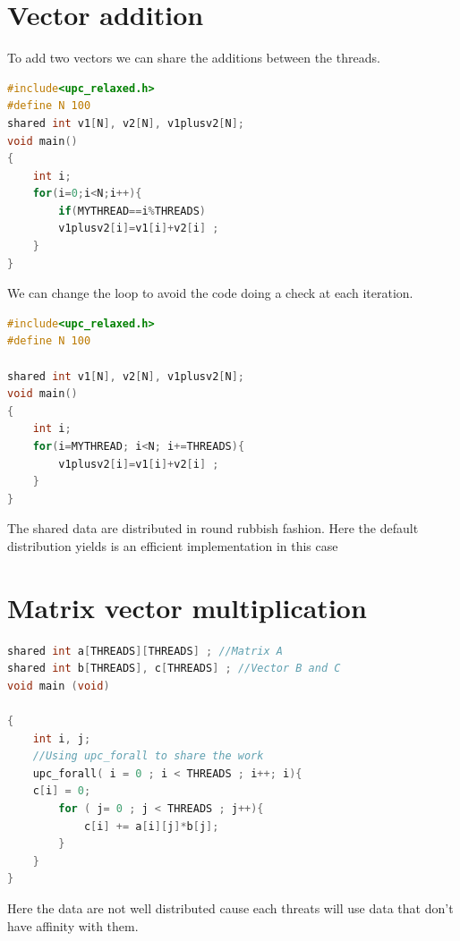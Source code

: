 \documentclass{report}
\begin{document}
\section{Vector addition}

To add two vectors we can share the additions between the threads.

\begin{lstlisting}[language=C]
#include<upc_relaxed.h> 
#define N 100 
shared int v1[N], v2[N], v1plusv2[N]; 
void main() 
{ 
    int i; 
    for(i=0;i<N;i++){
        if(MYTHREAD==i%THREADS) 
        v1plusv2[i]=v1[i]+v2[i] ; 
    }
}
\end{lstlisting}

    We can change the loop to avoid the code doing a check at each iteration.

\begin{lstlisting}[language=C]
#include<upc_relaxed.h> 
#define N 100 

shared int v1[N], v2[N], v1plusv2[N]; 
void main() 
{ 
    int i; 
    for(i=MYTHREAD; i<N; i+=THREADS){
        v1plusv2[i]=v1[i]+v2[i] ; 
    }
}
\end{lstlisting}

The shared data are distributed in round rubbish fashion. Here the default distribution yields is an efficient implementation in this case

\section{Matrix vector multiplication}

\begin{lstlisting}[language=C]
shared int a[THREADS][THREADS] ; //Matrix A
shared int b[THREADS], c[THREADS] ; //Vector B and C
void main (void) 

{
    int i, j; 
    //Using upc_forall to share the work
    upc_forall( i = 0 ; i < THREADS ; i++; i){
    c[i] = 0;
        for ( j= 0 ; j < THREADS ; j++){
            c[i] += a[i][j]*b[j];
        }
    }
}
\end{lstlisting}

Here the data are not well distributed cause each threats will use data that don't have affinity with them.
\end{document}
